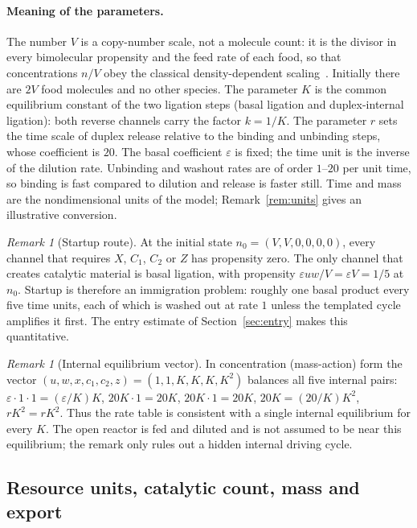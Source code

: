 \documentclass[11pt,a4paper]{article}
\theoremstyle{plain}
\theoremstyle{definition}
\theoremstyle{remark}
\newtheorem{remark}[theorem]{Remark}
\newcommand{\eps}{\varepsilon}
\begin{document}
\paragraph{Meaning of the parameters.}
The number $V$ is a copy-number scale, not a molecule count: it is the divisor in every bimolecular propensity and the feed rate of each food, so that concentrations $n/V$ obey the classical density-dependent scaling~\citep{kurtz1972}. Initially there are $2V$ food molecules and no other species. The parameter $K$ is the common equilibrium constant of the two ligation steps (basal ligation and duplex-internal ligation): both reverse channels carry the factor $k=1/K$. The parameter $r$ sets the time scale of duplex release relative to the binding and unbinding steps, whose coefficient is $20$. The basal coefficient $\eps$ is fixed; the time unit is the inverse of the dilution rate. Unbinding and washout rates are of order $1$--$20$ per unit time, so binding is fast compared to dilution and release is faster still. Time and mass are the nondimensional units of the model; Remark~\ref{rem:units} gives an illustrative conversion.

\begin{remark}[Startup route]\label{rem:startup}
At the initial state $n_0=(V,V,0,0,0,0)$, every channel that requires $X$, $C_1$, $C_2$ or $Z$ has propensity zero. The only channel that creates catalytic material is basal ligation, with propensity $\eps uw/V=\eps V=1/5$ at $n_0$. Startup is therefore an immigration problem: roughly one basal product every five time units, each of which is washed out at rate $1$ unless the templated cycle amplifies it first. The entry estimate of Section~\ref{sec:entry} makes this quantitative.
\end{remark}

\begin{remark}[Internal equilibrium vector]\label{rem:equilibrium}
In concentration (mass-action) form the vector $(u,w,x,c_1,c_2,z)=(1,1,K,K,K,K^2)$ balances all five internal pairs: $\eps\cdot1\cdot1=(\eps/K)K$, $20K\cdot1=20K$, $20K\cdot 1=20K$, $20K=(20/K)K^2$, $rK^2=rK^2$. Thus the rate table is consistent with a single internal equilibrium for every $K$. The open reactor is fed and diluted and is not assumed to be near this equilibrium; the remark only rules out a hidden internal driving cycle.
\end{remark}

\subsection{Resource units, catalytic count, mass and export}
\end{document}
